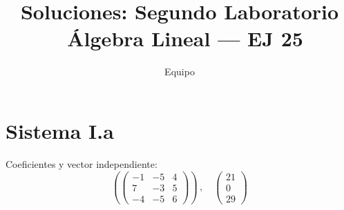 \documentclass{article}
\begin{document}
\title{Soluciones: Segundo Laboratorio \ Álgebra Lineal — EJ 25}
\author{Equipo}\date{}
\maketitle
\section*{Sistema I.a}
Coeficientes y vector independiente:
\[\left( \begin{pmatrix}-1 & -5 & 4 \\ 7 & -3 & 5 \\ -4 & -5 & 6\end{pmatrix}\right) \,, \quad \begin{pmatrix}21 \\ 0 \\ 29\end{pmatrix}\]
\end{document}
